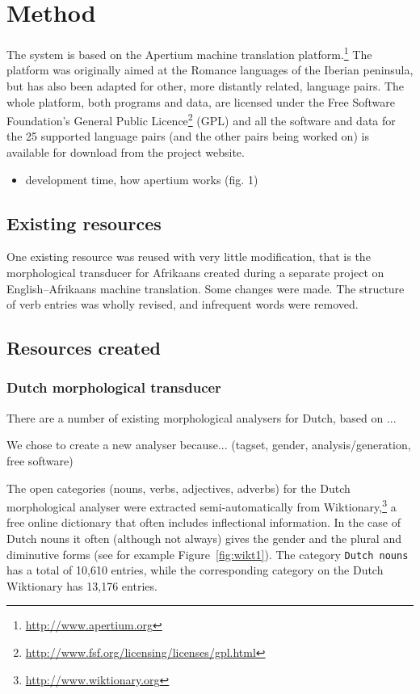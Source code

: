 \documentclass[11pt]{article}
\begin{document}
\section{Method}

The system is based on the Apertium machine translation platform.\footnote{\url{http://www.apertium.org}} The
platform was originally aimed at the Romance languages of the Iberian
peninsula, but has also been adapted for other, more distantly related,
language pairs. The whole platform, both programs and data, are licensed
under the Free Software Foundation's General Public
Licence\footnote{\url{http://www.fsf.org/licensing/licenses/gpl.html}} (GPL)
and all the software and data for the 25 supported language pairs (and the
other pairs being worked on) is available for download from the project
website.

\begin{itemize}
\item development time, how apertium works (fig. 1)
\end{itemize}

\subsection{Existing resources}

One existing resource was reused with very little modification, that is the 
morphological transducer for Afrikaans created during a separate project on English--Afrikaans
machine translation. Some changes were made. The structure of verb entries
was wholly revised, and infrequent words were removed.

\subsection{Resources created}

\subsubsection{Dutch morphological transducer}

There are a number of existing morphological analysers for Dutch, based on ...

We chose to create a new analyser because... (tagset, gender, analysis/generation, free software)

The open categories (nouns, verbs, adjectives, adverbs) for the Dutch 
morphological analyser were extracted semi-automatically from 
Wiktionary,\footnote{\url{http://www.wiktionary.org}} a free online 
dictionary that often includes inflectional information. In the case 
of Dutch nouns it often (although not always) gives the gender and the 
plural and diminutive forms (see for example Figure~\ref{fig:wikt1}).
The category {\small {\tt Dutch nouns}} has a total of 10,610 entries,
while the corresponding category on the Dutch Wiktionary has 13,176 entries.
\end{document}
